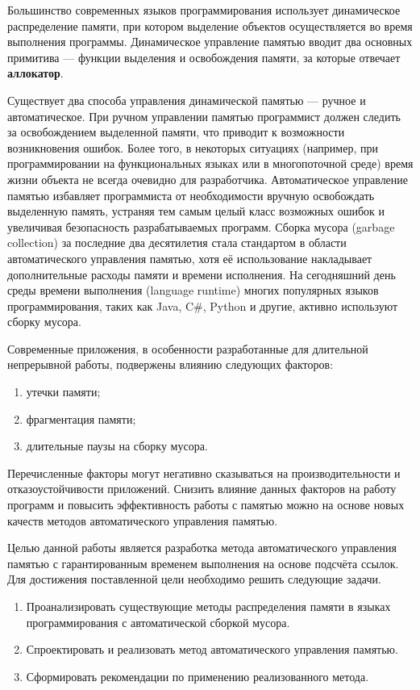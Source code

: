 Большинство современных языков программирования использует динамическое распределение памяти, при котором выделение объектов осуществляется во время выполнения программы. Динамическое управление памятью вводит два основных примитива --- функции выделения и освобождения памяти, за которые отвечает \textbf{аллокатор}. 

Существует два способа управления динамической памятью --- ручное и автоматическое. При ручном управлении памятью программист должен следить за освобождением выделенной памяти, что приводит к возможности возникновения ошибок. Более того, в некоторых ситуациях (например, при программировании на функциональных языках или в многопоточной среде) время жизни объекта не всегда очевидно для разработчика. \cite{elixir} Автоматическое управление памятью избавляет программиста от необходимости вручную освобождать выделенную память, устраняя тем самым целый класс возможных ошибок и увеличивая безопасность разрабатываемых программ. Сборка мусора (garbage collection) за последние два десятилетия стала стандартом в области автоматического управления памятью, хотя её использование накладывает дополнительные расходы памяти и времени исполнения. На сегодняшний день среды времени выполнения (language runtime) многих популярных языков программирования, таких как Java, C\#, Python и другие, активно используют сборку мусора. 

Современные приложения, в особенности разработанные для длительной непрерывной работы, подвержены влиянию следующих факторов: 
\begin{enumerate}[label*=\arabic*)]
	\item утечки памяти;
	\item фрагментация памяти;
	\item длительные паузы на сборку мусора.
\end{enumerate}
Перечисленные факторы могут негативно сказываться на производительности и отказоустойчивости приложений. Снизить влияние данных факторов на работу программ и повысить эффективность работы с памятью можно на основе новых качеств методов автоматического управления памятью.

Целью данной работы является разработка метода автоматического управления памятью с гарантированным временем выполнения на основе подсчёта ссылок. Для достижения поставленной цели необходимо решить следующие задачи.

\begin{enumerate}[label*=\arabic*.]
	\item Проанализировать существующие методы распределения памяти в языках программирования с автоматической сборкой мусора.
	\item Спроектировать и реализовать метод автоматического управления памятью.
	\item Сформировать рекомендации по применению реализованного метода. 
\end{enumerate}
